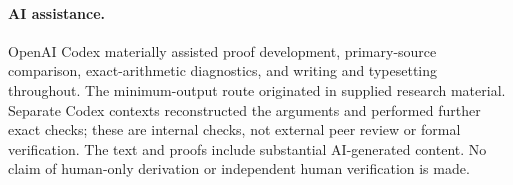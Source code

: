 \documentclass[acmlarge,screen,11pt,nonacm]{acmart}
\theoremstyle{definition}
\begin{document}
\paragraph{AI assistance.}
OpenAI Codex materially assisted proof development, primary-source comparison, exact-arithmetic diagnostics, and writing and typesetting throughout. The minimum-output route originated in supplied research material. Separate Codex contexts reconstructed the arguments and performed further exact checks; these are internal checks, not external peer review or formal verification. The text and proofs include substantial AI-generated content. No claim of human-only derivation or independent human verification is made.

\renewcommand{\bibfont}{\normalfont\normalsize}


\end{document}
